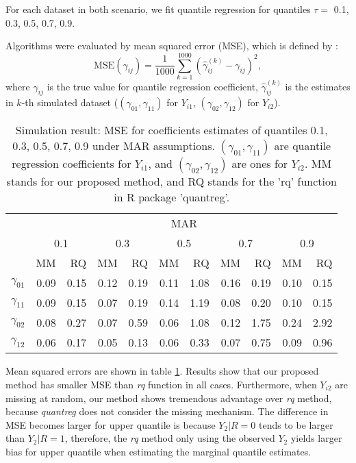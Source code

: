 \documentclass[12pt]{article}
\begin{document}
For each dataset in both scenario, we fit quantile regression for
quantiles $\tau =$ 0.1, 0.3, 0.5, 0.7, 0.9.

Algorithms were evaluated by mean squared error (MSE), which is
defined by :
\begin{equation*}
  \text{MSE} (\gamma_{ij}) = \frac{1}{1000} \sum_{k = 1}^{1000} 
\left( \hat{\gamma}_{ij}^{(k)}  - \gamma_{ij}\right)^2,
\end{equation*}
where $\gamma_{ij}$ is the true value for quantile regression
coefficient, $\hat{\gamma}_{ij}^{(k)}$ is the estimates in $k$-th
simulated dataset ($(\gamma_{01}, \gamma_{11})$ for $Y_{i1}$,
$(\gamma_{02}, \gamma_{12})$ for $Y_{i2}$).
 
\begin{table}[ht]
  \renewcommand{\arraystretch}{1.3}
  \centering
  \caption{Simulation result: MSE for coefficients estimates of quantiles
    0.1, 0.3, 0.5, 0.7, 0.9 under MAR assumptions. $(\gamma_{01}, \gamma_{11})$ 
    are quantile regression coefficients for $Y_{i1}$, and $(\gamma_{02}, \gamma_{12})$   
  are ones for $Y_{i2}$. MM stands for our proposed method, and RQ stands for the 'rq' 
    function in R package 'quantreg'.}\label{tab:simh2}  
  \vspace{10pt}
  \begin{tabular}{rrrrrrrrrrr}
    \toprule
    & \multicolumn{ 10}{c}{MAR} \\
    \cline{2-11}
    &  \multicolumn{2}{c}{0.1} &  \multicolumn{2}{c}{0.3} &  \multicolumn{2}{c}{0.5} &
  \multicolumn{2}{c}{0.7} &  \multicolumn{2}{c}{0.9} \\
    \cline{2-11}
    & MM & RQ    & MM & RQ    & MM & RQ    & MM & RQ    & MM & RQ \\
    \hline
    $\gamma_{01}$ & 0.09 & 0.15 & 0.12 & 0.19 & 0.11 & 1.08 & 0.16 & 0.19 & 0.10 & 0.15 \\ 
    $\gamma_{11}$ & 0.09 & 0.15 & 0.07 & 0.19 & 0.14 & 1.19 & 0.08 & 0.20 & 0.10 & 0.15 \\ 
    $\gamma_{02}$ & 0.08 & 0.27 & 0.07 & 0.59 & 0.06 & 1.08 & 0.12 & 1.75 & 0.24 & 2.92 \\ 
    $\gamma_{12}$ & 0.06 & 0.17 & 0.05 & 0.13 & 0.06 & 0.33 & 0.07 & 0.75 & 0.09 & 0.96 \\ 
    \bottomrule
  \end{tabular}
\end{table}
 
Mean squared errors are shown in table \ref{tab:simh2}. Results show
that our proposed method has smaller MSE than \textit{rq} function in
all cases. Furthermore, when $Y_{i2}$ are missing at random, our
method shows tremendous advantage over \textit{rq} method, because
\textit{quantreg} does not consider the missing mechanism.  The
difference in MSE becomes larger for upper quantile is because $Y_2 |R
= 0$ tends to be larger than $Y_2 | R = 1$, therefore, the \textit{rq}
method only using the observed $Y_2$ yields larger bias for upper quantile when 
estimating the marginal quantile estimates.
\end{document}
